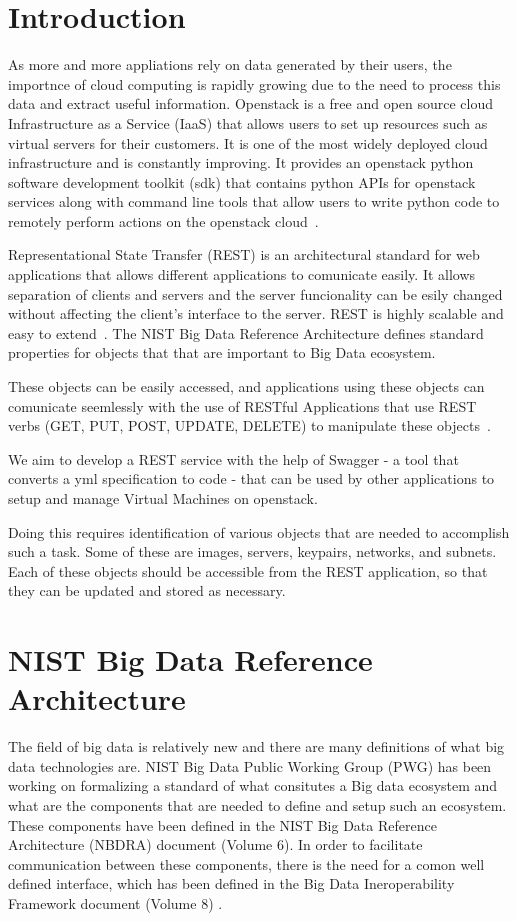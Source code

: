 \section{Introduction}
As more and more appliations rely on data generated by their users,
the importnce of cloud computing is rapidly growing due to the need to
process this data and extract useful information.  Openstack is a free
and open source cloud Infrastructure as a Service (IaaS) that allows
users to set up resources such as virtual servers for their
customers. It is one of the most widely deployed cloud infrastructure
and is constantly improving. It provides an openstack python software
development toolkit (sdk) that contains python APIs for openstack
services along with command line tools that allow users to write
python code to remotely perform actions on the openstack
cloud~\cite{hid-sp18-503-openstack-wiki}.

Representational State Transfer (REST) is an architectural standard
for web applications that allows different applications to comunicate
easily. It allows separation of clients and servers and the server
funcionality can be esily changed without affecting the client's
interface to the server. REST is highly scalable and easy to
extend~\cite{hid-sp18-503-REST}. The NIST Big Data Reference
Architecture defines standard properties for objects that that are
important to Big Data ecosystem.

These objects can be easily accessed, and applications using these
objects can comunicate seemlessly with the use of RESTful Applications
that use REST verbs (GET, PUT, POST, UPDATE, DELETE) to manipulate
these objects~\cite{hid-sp18-503-REST}.

We aim to develop a REST service with the help of Swagger - a tool
that converts a yml specification to code - that can be used by other
applications to setup and manage Virtual Machines on openstack.

Doing this requires identification of various objects that are needed
to accomplish such a task. Some of these are images, servers,
keypairs, networks, and subnets. Each of these objects should be
accessible from the REST application, so that they can be updated and
stored as necessary.

\section{NIST Big Data Reference Architecture}
The field of big data is relatively new and there are many definitions
of what big data technologies are. NIST Big Data Public Working Group
(PWG) has been working on formalizing a standard of what consitutes a
Big data ecosystem and what are the components that are needed to
define and setup such an ecosystem. These components have been defined
in the NIST Big Data Reference Architecture (NBDRA) document (Volume
6).  In order to facilitate communication between these components,
there is the need for a comon well defined interface, which has been
defined in the Big Data Ineroperability Framework document (Volume 8)
\cite{hid-sp18-503-BDRA}.

